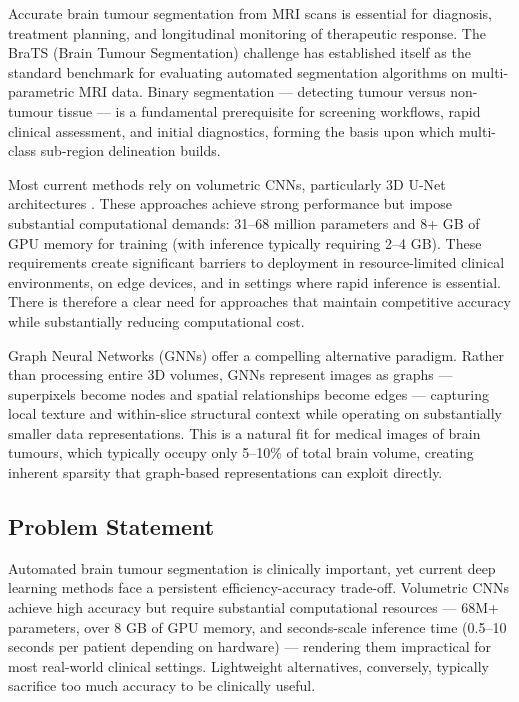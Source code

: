 \documentclass{article}
\begin{document}
Accurate brain tumour segmentation from MRI scans is essential for diagnosis, treatment planning, and longitudinal monitoring of therapeutic response. The BraTS (Brain Tumour Segmentation) challenge \cite{menze2015multimodal} has established itself as the standard benchmark for evaluating automated segmentation algorithms on multi-parametric MRI data. Binary segmentation — detecting tumour versus non-tumour tissue — is a fundamental prerequisite for screening workflows, rapid clinical assessment, and initial diagnostics, forming the basis upon which multi-class sub-region delineation builds.

Most current methods rely on volumetric CNNs, particularly 3D U-Net architectures \cite{ronneberger2015unet, cicek20163d}. These approaches achieve strong performance but impose substantial computational demands: 31--68 million parameters and 8+ GB of GPU memory for training (with inference typically requiring 2--4 GB). These requirements create significant barriers to deployment in resource-limited clinical environments, on edge devices, and in settings where rapid inference is essential. There is therefore a clear need for approaches that maintain competitive accuracy while substantially reducing computational cost.

Graph Neural Networks (GNNs) offer a compelling alternative paradigm. Rather than processing entire 3D volumes, GNNs represent images as graphs — superpixels become nodes and spatial relationships become edges — capturing local texture and within-slice structural context while operating on substantially smaller data representations. This is a natural fit for medical images of brain tumours, which typically occupy only 5--10\% of total brain volume, creating inherent sparsity that graph-based representations can exploit directly.


\subsection{Problem Statement}

Automated brain tumour segmentation is clinically important, yet current deep learning methods face a persistent efficiency-accuracy trade-off. Volumetric CNNs achieve high accuracy but require substantial computational resources — 68M+ parameters, over 8 GB of GPU memory, and seconds-scale inference time (0.5--10 seconds per patient depending on hardware) \cite{cicek20163d, isensee2021nnunet} — rendering them impractical for most real-world clinical settings. Lightweight alternatives, conversely, typically sacrifice too much accuracy to be clinically useful.
\end{document}
